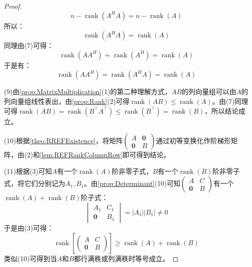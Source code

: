 \begin{proof}
	\begin{equation*}
		n-\operatorname{rank}(A^HA)=n-\operatorname{rank}(A)
	\end{equation*}
	所以：
	\begin{equation*}
		\operatorname{rank}(A^HA)=\operatorname{rank}(A)
	\end{equation*}
	同理由(7)可得：
	\begin{equation*}
		\operatorname{rank}(AA^H)=\operatorname{rank}(A^H)=\operatorname{rank}(A)
	\end{equation*}
	于是有：
	\begin{equation*}
		\operatorname{rank}(AA^H)=\operatorname{rank}(A^HA)=\operatorname{rank}(A)
	\end{equation*}\par
	(9)由\cref{prop:MatrixMultiplication}(1)的第二种理解方式，$AB$的列向量组可以由$A$的列向量组线性表出，由\cref{prop:Rank}(2)可得$\operatorname{rank}(AB)\leqslant\operatorname{rank}(A)$。由(7)同理可得$\operatorname{rank}(AB)=\operatorname{rank}(B^{\top}A^{\top})\leqslant\operatorname{rank}(B^{\top})=\operatorname{rank}(B)$，所以结论成立。\par
	(10)根据\cref{theo:RREFExistence}，将矩阵$\begin{pmatrix}
		A & \mathbf{0} \\
		\mathbf{0} & B
	\end{pmatrix}$通过初等变换化作阶梯形矩阵，由(2)和\cref{lem:REFRankColumnRow}即可得到结论。\par
	(11)根据(3)可知$A$有一个$\operatorname{rank}(A)$阶非零子式，$B$有一个$\operatorname{rank}(B)$阶非零子式，将它们分别记为$A_1,B_1$。由\cref{prop:Determinant}(10)可知$\begin{pmatrix}
		A & C \\
		\mathbf{0} & B
	\end{pmatrix}$有一个$\operatorname{rank}(A)+\operatorname{rank}(B)$阶子式：
	\begin{equation*}
		\begin{vmatrix}
			A_1 & C_1 \\
			\mathbf{0} & B_1
		\end{vmatrix}=|A_1||B_1|\ne0
	\end{equation*}
	于是由(3)可得：
	\begin{equation*}
		\operatorname{rank}\left[
		\begin{pmatrix}
			A & C \\
			\mathbf{0} & B
		\end{pmatrix}
		\right]\geqslant\operatorname{rank}(A)+\operatorname{rank}(B)
	\end{equation*}
	类似(10)可得到当$A$和$B$都行满秩或列满秩时等号成立。
\end{proof}

